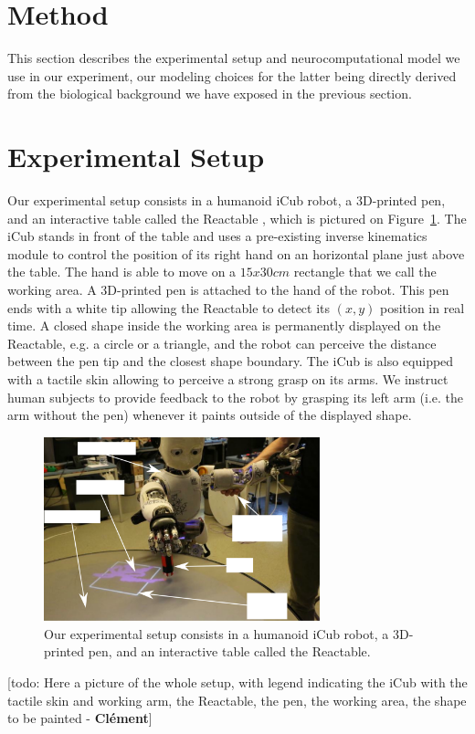 \documentclass[letterpaper, 10 pt, conference]{ieeeconf}  %
\newcommand\cmf[1]{{\footnotesize \color{red}[#1 - \textbf{Cl\'ement}]}} %
\begin{document}
\section{Method}
\label{sec:model}

This section describes the experimental setup and neurocomputational model we use in our experiment, our modeling choices for the latter being directly derived from the biological background we have exposed in the previous section. 


\section{Experimental Setup}
\label{sec:setup}
Our experimental setup consists in a humanoid iCub robot, a 3D-printed pen, and an interactive table called the Reactable \cite{jorda2008stage}, which is pictured on Figure~\ref{fig:setup}. The iCub stands in front of the table and uses a pre-existing inverse kinematics module to control the position of its right hand on an horizontal plane just above the table. The hand is able to move on a $15 x 30 cm$ rectangle that we call the working area. A 3D-printed pen is attached to the hand of the robot. This pen ends with a white tip allowing the Reactable to detect its $(x, y)$ position in real time. A closed shape inside the working area is permanently displayed on the Reactable, e.g. a circle or a triangle, and the robot can perceive the distance between the pen tip and the closest shape boundary. The iCub is also equipped with a tactile skin allowing to perceive a strong grasp on its arms. We instruct human subjects to provide feedback to the robot by grasping its left arm (i.e. the arm without the pen) whenever it paints outside of the displayed shape.


\begin{figure}[!t]
\centering
\includegraphics[width=8cm]{setup}
\caption{Our experimental setup consists in a humanoid iCub robot, a 3D-printed pen, and an interactive table called the Reactable.}
\label{fig:setup}
\end{figure}
\cmf{todo: Here a picture of the whole setup, with legend indicating the iCub with the tactile skin and working arm, the Reactable, the pen, the working area, the shape to be painted}
\end{document}
